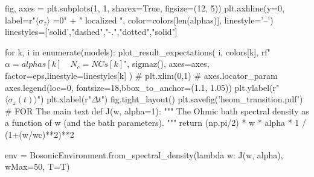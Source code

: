 fig, axes = plt.subplots(1, 1, sharex=True, figsize=(12, 5))
plt.axhline(y=0, label=r"$\langle \sigma_{z} \rangle$ =0" +
            " localized ", color=colors[len(alphas)], linestyle='--')
linestyles=['solid',"dashed","-.","dotted","solid"]

for k, i in enumerate(models):
    plot_result_expectations(
        i, colors[k], rf"$\alpha={alphas[k]} \quad N_c={NCs[k]}$",
        sigmaz(), axes=axes, factor=eps,linestyle=linestyles[k]
    )
# plt.xlim(0,1)
# axes.locator_param
axes.legend(loc=0, fontsize=18,bbox_to_anchor=(1.1, 1.05))
plt.ylabel(r"$\langle \sigma_{z}(t) \rangle$")
plt.xlabel(r"$\Delta t$")
fig.tight_layout()
plt.savefig('heom_transition.pdf')
# FOR The main text
def J(w, alpha=1):
    """ The Ohmic bath spectral density as a function
    of w (and the bath parameters). """
    return (np.pi/2) * w * alpha * 1 / (1+(w/wc)**2)**2

env = BosonicEnvironment.from_spectral_density(lambda w: J(w, alpha), wMax=50, T=T)
